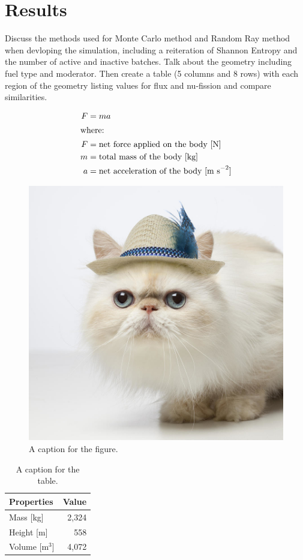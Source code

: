\pagebreak
\section{Results}
\label{sec:results}

Discuss the methods used for Monte Carlo method and Random Ray method when devloping the simulation, including a reiteration of Shannon Entropy and the number of active and inactive batches. Talk about the geometry including fuel type and moderator. Then create a table (5 columns and 8 rows) with each region of the geometry listing values for flux and nu-fission and compare similarities.

\begin{align}
	F &= ma \\
	\intertext{where:}
	F &= \text{net force applied on the body [N]} \nonumber \\
	m &= \text{total mass of the body [kg]} \nonumber \\
	a &= \text{net acceleration of the body [m s}^{-2}\text{]} \nonumber
\end{align}

\begin{figure}[htbp!]
	\begin{center}
		\includegraphics[scale=0.7]{./figures/catinhat}
	\end{center}
	\caption{A caption for the figure.}
	\label{fig:catinhat}
\end{figure}

\begin{table}[h]
	\centering
        \caption{A caption for the table.}
\begin{tabular}{lr}
	\hline
	\textbf{Properties} & \textbf{Value} \\
	\hline
    Mass [kg] & 2,324 \\
    Height [m] & 558 \\
    Volume [m$^3$] & 4,072 \\
    \hline
\end{tabular}
\label{tab:table1}
\end {table}

